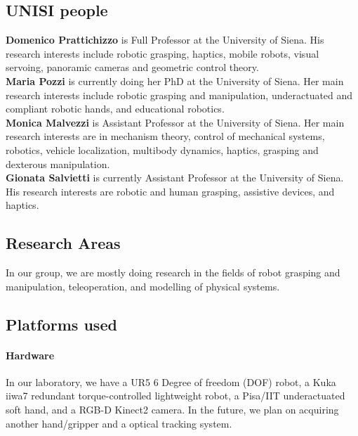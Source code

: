 \documentclass[]{article}
\begin{document}
\subsection{UNISI people}
\textbf{Domenico Prattichizzo} is Full Professor at the University of Siena. His research interests include robotic grasping, haptics, mobile robots, visual servoing, panoramic cameras and geometric control theory.\\
\textbf{Maria Pozzi} is currently doing her PhD at the University of Siena. Her main research interests include robotic grasping and manipulation, underactuated and compliant robotic hands, and educational robotics.\\
\textbf{Monica Malvezzi} is Assistant Professor at the University of Siena. Her main research interests are in mechanism theory, control of mechanical systems, robotics, vehicle localization, multibody dynamics, haptics, grasping and dexterous manipulation.\\		
\textbf{Gionata Salvietti} is currently Assistant Professor  at the University of Siena. His research interests are robotic and human grasping, assistive devices, and haptics.\\		

\subsection{Research Areas}

In our group, we are mostly doing research in the fields of robot grasping and manipulation, teleoperation, and modelling of physical systems.

\subsection{Platforms used}
\paragraph{Hardware} In our laboratory, we have a UR5 6 Degree of freedom (DOF) robot, a Kuka iiwa7 redundant torque-controlled lightweight robot, a Pisa/IIT underactuated soft hand, and a RGB-D Kinect2 camera.
In the future, we plan on acquiring another hand/gripper and a optical tracking system.
\end{document}

